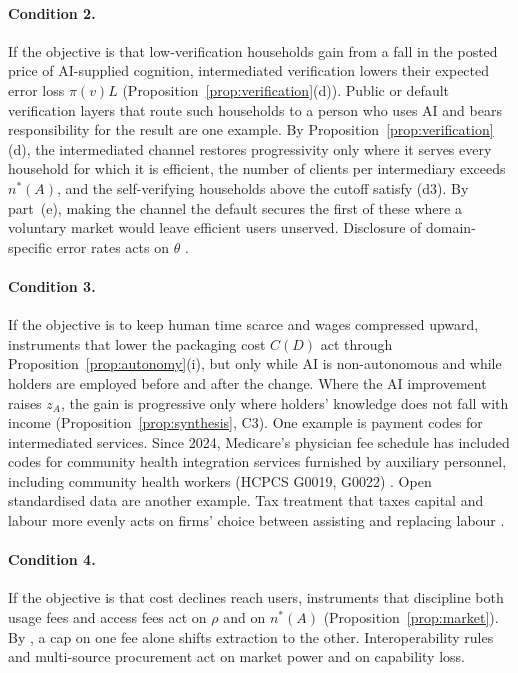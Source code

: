 \documentclass[12pt]{article}
\theoremstyle{remark}
\begin{document}
\paragraph{Condition 2.} If the objective is that low-verification households gain from a fall in the posted price of AI-supplied cognition, intermediated verification lowers their expected error loss $\pi(v)L$ (Proposition~\ref{prop:verification}(d)). Public or default verification layers that route such households to a person who uses AI and bears responsibility for the result are one example. By Proposition~\ref{prop:verification}(d), the intermediated channel restores progressivity only where it serves every household for which it is efficient, the number of clients per intermediary exceeds $n^*(A)$, and the self-verifying households above the cutoff satisfy (d3). By part~(e), making the channel the default secures the first of these where a voluntary market would leave efficient users unserved. Disclosure of domain-specific error rates acts on $\theta$ \citep{steyvers2025know}.

\paragraph{Condition 3.} If the objective is to keep human time scarce and wages compressed upward, instruments that lower the packaging cost $C(D)$ act through Proposition~\ref{prop:autonomy}(i), but only while AI is non-autonomous and while holders are employed before and after the change. Where the AI improvement raises $z_A$, the gain is progressive only where holders' knowledge does not fall with income (Proposition~\ref{prop:synthesis}, C3). One example is payment codes for intermediated services. Since 2024, Medicare's physician fee schedule has included codes for community health integration services furnished by auxiliary personnel, including community health workers (HCPCS G0019, G0022) \citep{cms2023pfs}. Open standardised data are another example. Tax treatment that taxes capital and labour more evenly acts on firms' choice between assisting and replacing labour \citep{acemoglu2020tax}.

\paragraph{Condition 4.} If the objective is that cost declines reach users, instruments that discipline both usage fees and access fees act on $\rho$ and on $n^*(A)$ (Proposition~\ref{prop:market}). By \citet[p.~110]{athey2026competition}, a cap on one fee alone shifts extraction to the other. Interoperability rules and multi-source procurement act on market power and on capability loss.
\end{document}
